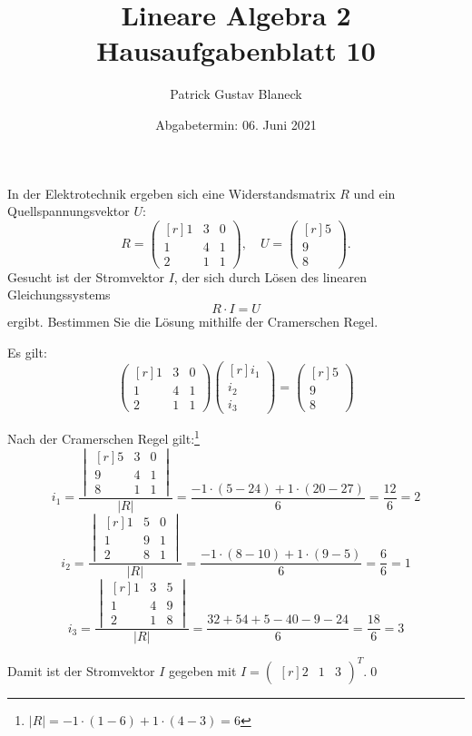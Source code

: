 \documentclass[answers]{exam}
\title{Lineare Algebra 2 \\ \large{Hausaufgabenblatt 10}}
\author{Patrick Gustav Blaneck}
\date{Abgabetermin: 06. Juni 2021}
\newcommand{\abs}[1]{\left| #1 \right|}
\newcommand{\vektor}[1]{\begin{pmatrix*}[r] #1 \end{pmatrix*}}
\newcommand{\dvektor}[1]{\begin{vmatrix*}[r] #1 \end{vmatrix*}}
\begin{document}
\maketitle
\begin{questions}
    \setcounter{question}{4}
    \question
    In der Elektrotechnik ergeben sich eine Widerstandsmatrix $R$ und ein Quellspannungsvektor $U$:
    $$
        R = \vektor{1 & 3 & 0 \\ 1 & 4 & 1 \\ 2 & 1 & 1}, \quad U = \vektor{5 \\ 9 \\ 8}.
    $$
    Gesucht ist der Stromvektor $I$, der sich durch Lösen des linearen Gleichungssystems
    $$
        R \cdot I = U
    $$
    ergibt.
    Bestimmen Sie die Lösung mithilfe der Cramerschen Regel.
    \begin{solution}
        Es gilt:
        $$
            \vektor{1 & 3 & 0 \\ 1 & 4 & 1 \\ 2 & 1 & 1}  \vektor{i_1 \\ i_2 \\ i_3} = \vektor{5 \\ 9 \\ 8}
        $$

        Nach der Cramerschen Regel gilt:\footnote{$\abs{R} = -1 \cdot (1-6) + 1 \cdot (4-3) = 6$}
        $$
            i_1 = \frac{\dvektor{5 & 3 & 0 \\ 9 & 4 & 1 \\ 8 & 1 & 1}}{\abs{R}} = \frac{-1 \cdot (5-24) + 1 \cdot (20-27)}{6} = \frac{12}{6} = 2
        $$
        $$
            i_2 = \frac{\dvektor{1 & 5 & 0 \\ 1 & 9 & 1 \\ 2 & 8 & 1}}{\abs{R}} = \frac{-1 \cdot (8-10) + 1 \cdot (9-5)}{6} = \frac{6}{6} = 1
        $$
        $$
            i_3 = \frac{\dvektor{1 & 3 & 5 \\ 1 & 4 & 9 \\ 2 & 1 & 8}}{\abs{R}} = \frac{32+54+5-40-9-24}{6} = \frac{18}{6} = 3
        $$

        Damit ist der Stromvektor $I$ gegeben mit $I = \vektor{2 & 1 & 3}^T$.\qed
    \end{solution}


\end{questions}
\end{document}
